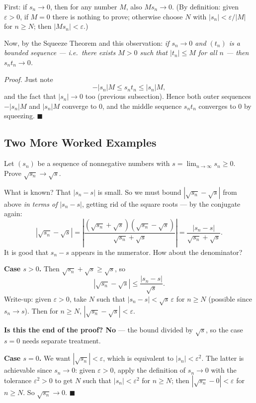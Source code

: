 \documentclass[11pt]{report}
\begin{document}
\begin{exbox}
First: if $s_n \to 0$, then for any number $M$, also $M s_n \to 0$. (By definition: given $\varepsilon > 0$, if $M = 0$ there is nothing to prove; otherwise choose $N$ with $|s_n| < \varepsilon / |M|$ for $n \geq N$; then $|M s_n| < \varepsilon$.)

Now, by the Squeeze Theorem and this observation: \emph{if $s_n \to 0$ and $(t_n)$ is a bounded sequence --- i.e.\ there exists $M > 0$ such that $|t_n| \leq M$ for all $n$ --- then $s_n t_n \to 0$.}

\emph{Proof.} Just note
\[
-|s_n| M \leq s_n t_n \leq |s_n| M,
\]
and the fact that $|s_n| \to 0$ too (previous subsection). Hence both outer sequences $-|s_n|M$ and $|s_n|M$ converge to $0$, and the middle sequence $s_n t_n$ converges to $0$ by squeezing. \hfill $\blacksquare$
\end{exbox}

\subsection{Two More Worked Examples}

\begin{exbox}
Let $(s_n)$ be a sequence of nonnegative numbers with $s = \lim_{n\to\infty} s_n \geq 0$. Prove $\sqrt{s_n} \to \sqrt{s}$.

What is known? That $|s_n - s|$ is small. So we must bound $|\sqrt{s_n} - \sqrt{s}|$ from above \emph{in terms of} $|s_n - s|$, getting rid of the square roots --- by the conjugate again:
\[
\left| \sqrt{s_n} - \sqrt{s} \right|
= \left| \frac{(\sqrt{s_n} + \sqrt{s})(\sqrt{s_n} - \sqrt{s})}{\sqrt{s_n} + \sqrt{s}} \right|
= \frac{|s_n - s|}{\sqrt{s_n} + \sqrt{s}}.
\]
It is good that $s_n - s$ appears in the numerator. How about the denominator?

\textbf{Case $s > 0$.} Then $\sqrt{s_n} + \sqrt{s} \geq \sqrt{s}$, so
\[
\left| \sqrt{s_n} - \sqrt{s} \right| \leq \frac{|s_n - s|}{\sqrt{s}}.
\]
Write-up: given $\varepsilon > 0$, take $N$ such that $|s_n - s| < \sqrt{s}\, \varepsilon$ for $n \geq N$ (possible since $s_n \to s$). Then for $n \geq N$, $|\sqrt{s_n} - \sqrt{s}| < \varepsilon$.

\textbf{Is this the end of the proof? No} --- the bound divided by $\sqrt{s}$, so the case $s = 0$ needs separate treatment.

\textbf{Case $s = 0$.} We want $|\sqrt{s_n}| < \varepsilon$, which is equivalent to $|s_n| < \varepsilon^2$. The latter is achievable since $s_n \to 0$: given $\varepsilon > 0$, apply the definition of $s_n \to 0$ with the tolerance $\varepsilon^2 > 0$ to get $N$ such that $|s_n| < \varepsilon^2$ for $n \geq N$; then $|\sqrt{s_n} - 0| < \varepsilon$ for $n \geq N$. So $\sqrt{s_n} \to 0$. \hfill $\blacksquare$
\end{exbox}
\end{document}
